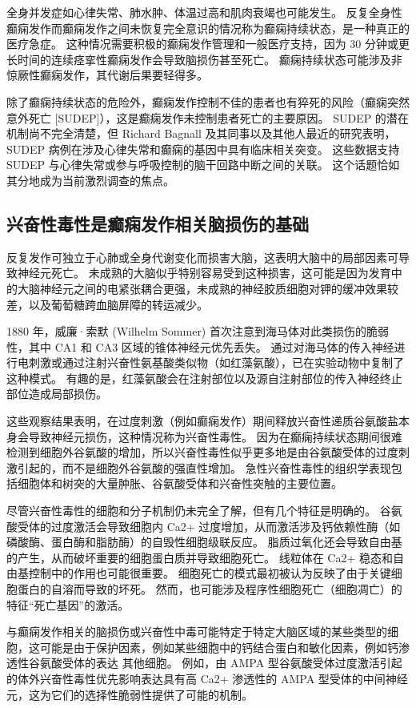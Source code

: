 全身并发症如心律失常、肺水肿、体温过高和肌肉衰竭也可能发生。
反复全身性癫痫发作而癫痫发作之间未恢复完全意识的情况称为癫痫持续状态，是一种真正的医疗急症。
这种情况需要积极的癫痫发作管理和一般医疗支持，因为 30 分钟或更长时间的连续痉挛性癫痫发作会导致脑损伤甚至死亡。
癫痫持续状态可能涉及非惊厥性癫痫发作，其代谢后果要轻得多。


除了癫痫持续状态的危险外，癫痫发作控制不佳的患者也有猝死的风险（癫痫突然意外死亡 [SUDEP]），这是癫痫发作未控制患者死亡的主要原因。
SUDEP 的潜在机制尚不完全清楚，但 Richard Bagnall 及其同事以及其他人最近的研究表明，SUDEP 病例在涉及心律失常和癫痫的基因中具有临床相关突变。
这些数据支持 SUDEP 与心律失常或参与呼吸控制的脑干回路中断之间的关联。
这个话题恰如其分地成为当前激烈调查的焦点。



\subsection{兴奋性毒性是癫痫发作相关脑损伤的基础}

反复发作可独立于心肺或全身代谢变化而损害大脑，这表明大脑中的局部因素可导致神经元死亡。
未成熟的大脑似乎特别容易受到这种损害，这可能是因为发育中的大脑神经元之间的电紧张耦合更强，未成熟的神经胶质细胞对钾的缓冲效果较差，以及葡萄糖跨血脑屏障的转运减少。


1880 年，威廉·索默 (Wilhelm Sommer) 首次注意到海马体对此类损伤的脆弱性，其中 CA1 和 CA3 区域的锥体神经元优先丢失。
通过对海马体的传入神经进行电刺激或通过注射兴奋性氨基酸类似物（如红藻氨酸），已在实验动物中复制了这种模式。
有趣的是，红藻氨酸会在注射部位以及源自注射部位的传入神经终止部位造成局部损伤。


这些观察结果表明，在过度刺激（例如癫痫发作）期间释放兴奋性递质谷氨酸盐本身会导致神经元损伤，这种情况称为兴奋性毒性。
因为在癫痫持续状态期间很难检测到细胞外谷氨酸的增加，所以兴奋性毒性似乎更多地是由谷氨酸受体的过度刺激引起的，而不是细胞外谷氨酸的强直性增加。
急性兴奋性毒性的组织学表现包括细胞体和树突的大量肿胀、谷氨酸受体和兴奋性突触的主要位置。


尽管兴奋性毒性的细胞和分子机制仍未完全了解，但有几个特征是明确的。
谷氨酸受体的过度激活会导致细胞内 Ca2+ 过度增加，从而激活涉及钙依赖性酶（如磷酸酶、蛋白酶和脂肪酶）的自毁性细胞级联反应。
脂质过氧化还会导致自由基的产生，从而破坏重要的细胞蛋白质并导致细胞死亡。
线粒体在 Ca2+ 稳态和自由基控制中的作用也可能很重要。 细胞死亡的模式最初被认为反映了由于关键细胞蛋白的自溶而导致的坏死。
然而，也可能涉及程序性细胞死亡（细胞凋亡）的特征“死亡基因”的激活。


与癫痫发作相关的脑损伤或兴奋性中毒可能特定于特定大脑区域的某些类型的细胞，这可能是由于保护因素，例如某些细胞中的钙结合蛋白和敏化因素，例如钙渗透性谷氨酸受体的表达 其他细胞。
例如，由 AMPA 型谷氨酸受体过度激活引起的体外兴奋性毒性优先影响表达具有高 Ca2+ 渗透性的 AMPA 型受体的中间神经元，这为它们的选择性脆弱性提供了可能的机制。


